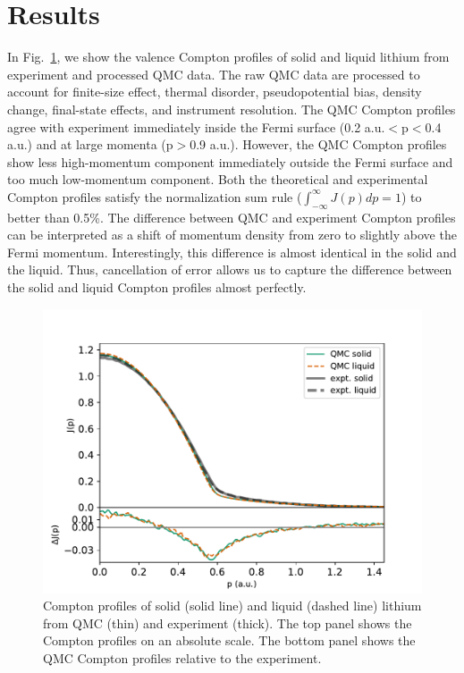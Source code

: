 \documentclass[aps,prb,showpacs,preprintnumbers,amsmath,amssymb,superscriptaddress,twocolumn]{revtex4-1}
\begin{document}
\section{Results} \label{sec:results}

In Fig.~\ref{fig:sl-jp-djp}, we show the valence Compton profiles of solid and liquid lithium from experiment and processed QMC data. The raw QMC data are processed to account for finite-size effect, thermal disorder, pseudopotential bias, density change, final-state effects, and instrument resolution. The QMC Compton profiles agree with experiment immediately inside the Fermi surface (0.2 a.u.$<$p$<$0.4 a.u.) and at large momenta (p$>$0.9  a.u.). However, the QMC Compton profiles show less high-momentum component immediately outside the Fermi surface and too much low-momentum component. Both the theoretical and experimental Compton profiles satisfy the normalization sum rule ($\int_{-\infty}^{\infty} J(p)dp=1$) to better than 0.5\%. The difference between QMC and experiment Compton profiles can be interpreted as a shift of momentum density from zero to slightly above the Fermi momentum. Interestingly, this difference is almost identical in the solid and the liquid. Thus, cancellation of error allows us to capture the difference between the solid and liquid Compton profiles almost perfectly.

\begin{figure}[h]
\includegraphics[width=\linewidth]{li58_sl-jp}
\caption{Compton profiles of solid (solid line) and liquid (dashed line) lithium from QMC (thin) and experiment (thick). The top panel shows the Compton profiles on an absolute scale. The bottom panel shows the QMC Compton profiles relative to the experiment.\label{fig:sl-jp-djp}}
\end{figure}
\end{document}
